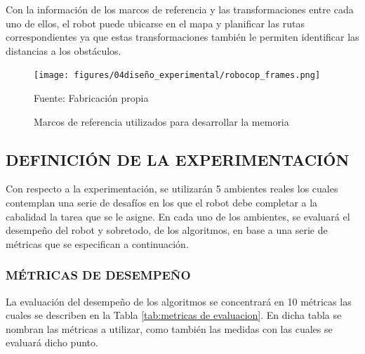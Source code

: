 Con la información de los marcos de referencia y las transformaciones entre cada uno de ellos, el robot puede ubicarse en el mapa y planificar las rutas correspondientes ya que estas transformaciones también le permiten identificar las distancias a los obstáculos.

\begin{figure}[H]
\centering
\texttt{[image: figures/04diseño\_experimental/robocop\_frames.png]}
\caption{\label{fig:frames_robocop} Marcos de referencia utilizados para desarrollar la memoria} 
Fuente: Fabricación propia
\end{figure}

\newpage
\subsection{DEFINICIÓN DE LA EXPERIMENTACIÓN}
Con respecto a la experimentación, se utilizarán 5 ambientes reales los cuales contemplan una serie de desafíos en los que el robot debe completar a la cabalidad la tarea que se le asigne. En cada uno de los ambientes, se evaluará el desempeño del robot y sobretodo, de los algoritmos, en base a una serie de métricas que se especifican a continuación.

\subsubsection{MÉTRICAS DE DESEMPEÑO}
La evaluación del desempeño de los algoritmos se concentrará en 10 métricas las cuales se describen en la Tabla \ref{tab:metricas de evaluacion}. En dicha tabla se nombran las métricas a utilizar, como también las medidas con las cuales se evaluará dicho punto.

